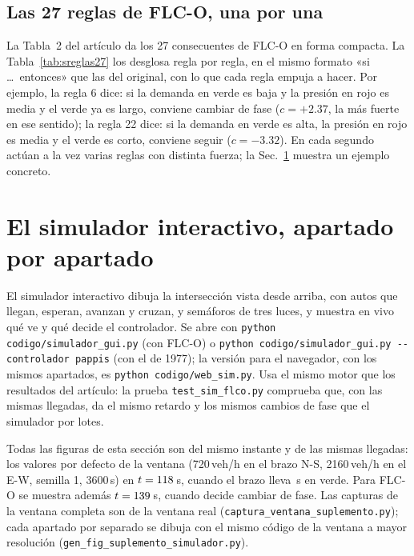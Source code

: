 \documentclass[journal]{IEEEtran}
\begin{document}
\subsection{Las 27 reglas de FLC-O, una por una}
La Tabla~2 del artículo da los 27 consecuentes de FLC-O en forma compacta. La Tabla~\ref{tab:sreglas27} los desglosa regla por regla, en el mismo formato «si \dots\ entonces» que las del original, con lo que cada regla empuja a hacer. Por ejemplo, la regla 6 dice: si la demanda en verde es baja y la presión en rojo es media y el verde ya es largo, conviene cambiar de fase ($c=+2.37$, la más fuerte en ese sentido); la regla 22 dice: si la demanda en verde es alta, la presión en rojo es media y el verde es corto, conviene seguir ($c=-3.32$). En cada segundo actúan a la vez varias reglas con distinta fuerza; la Sec.~\ref{sec:s-sim} muestra un ejemplo concreto.



\clearpage
\FloatBarrier
\section{El simulador interactivo, apartado por apartado}
\label{sec:s-sim}
El simulador interactivo dibuja la intersección vista desde arriba, con autos que llegan, esperan, avanzan y cruzan, y semáforos de tres luces, y muestra en vivo qué ve y qué decide el controlador. Se abre con \texttt{python codigo/simulador\_gui.py} (con FLC-O) o \texttt{python codigo/simulador\_gui.py -{}-controlador pappis} (con el de 1977); la versión para el navegador, con los mismos apartados, es \texttt{python codigo/web\_sim.py}. Usa el mismo motor que los resultados del artículo: la prueba \texttt{test\_sim\_flco.py} comprueba que, con las mismas llegadas, da el mismo retardo y los mismos cambios de fase que el simulador por lotes.

Todas las figuras de esta sección son del mismo instante y de las mismas llegadas: los valores por defecto de la ventana (720\,veh/h en el brazo N-S, 2160\,veh/h en el E-W, semilla 1, 3600\,s) en $t=118$\,s, cuando el brazo \SimVerde{} lleva \SimV\,s en verde. Para FLC-O se muestra además $t=139$\,s, cuando decide cambiar de fase. Las capturas de la ventana completa son de la ventana real (\texttt{captura\_ventana\_suplemento.py}); cada apartado por separado se dibuja con el mismo código de la ventana a mayor resolución (\texttt{gen\_fig\_suplemento\_simulador.py}).

\FloatBarrier
\end{document}

